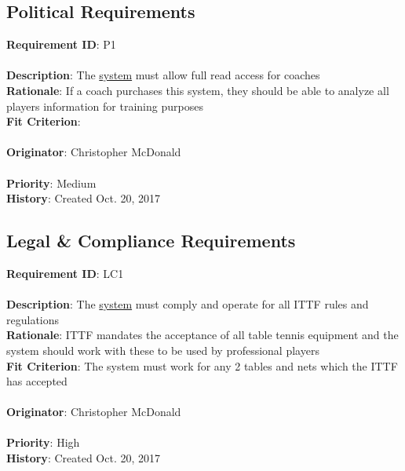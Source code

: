 \documentclass[11pt]{article}
\begin{document}
\subsection{Political Requirements}
\begin{framed}
	\noindent\textbf{Requirement ID}: P1\\\\
	\noindent\textbf{Description}: The \hyperref[sec:definitions]{system} must allow full read access for coaches \\
	\textbf{Rationale}: If a coach purchases this system, they should be able to analyze all players information for training purposes \\
	\textbf{Fit Criterion}: \\\\
	\textbf{Originator}: Christopher McDonald \\\\
	\textbf{Priority}: Medium \hfill \\
	\noindent\textbf{History}: Created Oct. 20, 2017
\end{framed}
\subsection{Legal \& Compliance Requirements}
\begin{framed}
	\noindent\textbf{Requirement ID}: LC1 \hfill\\\\
	\noindent\textbf{Description}: The \hyperref[sec:definitions]{system} must comply and operate for all ITTF rules and regulations \\
	\textbf{Rationale}: ITTF mandates the acceptance of all table tennis equipment and the system should work with these to be used by professional players \\
	\textbf{Fit Criterion}: The system must work for any 2 tables and nets which the ITTF has accepted \\\\
	\textbf{Originator}: Christopher McDonald \\\\
	\textbf{Priority}: High \hfill \\
	\noindent\textbf{History}: Created Oct. 20, 2017
\end{framed}
\end{document}
